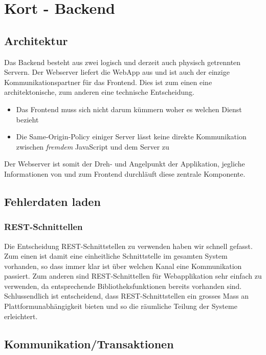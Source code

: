 \chapter{Kort - Backend}
\label{backend}

\section{Architektur}
Das Backend besteht aus zwei logisch und derzeit auch physisch getrennten Servern. 
Der Webserver liefert die \gls{WebApp} aus und ist auch der einzige Kommunikationspartner für das Frontend. Dies ist zum einen eine architektonische, zum anderen eine technische Entscheidung.

\begin{itemize}
\item Das Frontend muss sich nicht darum kümmern woher es welchen Dienst bezieht
\item Die Same-Origin-Policy\cite{sop} einiger Server lässt keine direkte Kommunikation zwischen \emph{fremdem} JavaScript und dem Server zu
\end{itemize}

Der Webserver ist somit der Dreh- und Angelpunkt der Applikation, jegliche Informationen von und zum Frontend durchläuft diese zentrale Komponente.

\section{Fehlerdaten laden}

\subsection{REST-Schnittellen}
Die Entscheidung \gls{REST}-Schnittstellen zu verwenden haben wir schnell gefasst. 
Zum einen ist damit eine einheitliche Schnittstelle im gesamten System vorhanden, so dass immer klar ist über welchen Kanal eine Kommunikation passiert.
Zum anderen sind \gls{REST}-Schnittellen für Webapplikation sehr einfach zu verwenden, da entsprechende Bibliotheksfunktionen bereits vorhanden sind.
Schlussendlich ist entscheidend, dass \gls{REST}-Schnittstellen ein grosses Mass an Plattformunabhängigkeit bieten und so die räumliche Teilung der Systeme erleichtert.


\section{Kommunikation/Transaktionen}

